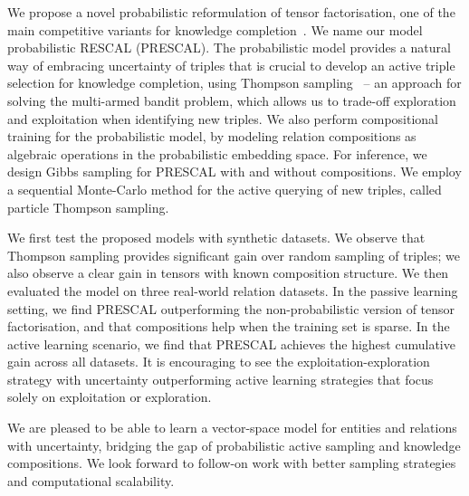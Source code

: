 {%
We propose a novel probabilistic reformulation of tensor factorisation,
one of the main competitive variants for knowledge completion~\cite{nickel2015review}.
We name our model probabilistic RESCAL (PRESCAL).
The probabilistic model provides a natural way of
embracing uncertainty of triples that is crucial to develop
an active triple selection for knowledge completion, using
Thompson sampling~\cite{scott10bandit} -- an approach for solving the multi-armed bandit problem,
which allows us to trade-off exploration and exploitation when identifying new triples.
We also perform compositional training for the probabilistic model,
by modeling relation compositions as algebraic operations in the probabilistic embedding space.
For inference, we design Gibbs sampling for PRESCAL with and without compositions.
We employ a sequential Monte-Carlo method for the active querying of new triples,
called particle Thompson sampling.

We first test the proposed models with synthetic datasets.
We observe that Thompson sampling provides significant gain over random sampling of triples;
we also observe a clear gain in tensors with known composition structure.
We then evaluated the model on three real-world relation datasets. In the passive learning setting,
we find PRESCAL outperforming the non-probabilistic version of tensor factorisation,
and that compositions help when the training set is sparse.
In the active learning scenario,
we find that PRESCAL achieves the highest cumulative gain across all datasets.
It is encouraging to see the exploitation-exploration strategy with uncertainty outperforming
active learning strategies that focus solely on exploitation or exploration.

We are pleased to be able to learn a vector-space model for entities and relations with uncertainty,
bridging the gap of probabilistic active sampling and knowledge compositions.
We look forward to follow-on work with better sampling strategies and computational scalability.
}

